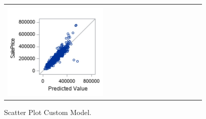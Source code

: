 \documentclass[11pt]{scrartcl} %
\begin{document}
\begin{figure}[H] %
	\centering
	\begin{tabular}{| p{}|}
	\hline
	\\
	\includegraphics[width=0.50\textwidth]{../graphics/A2Custscatt}\\
	\hline
	\end{tabular}	
	\caption{Scatter Plot Custom Model.}
	\label{fig:A2Customscatt}
\end{figure}
\end{document}
